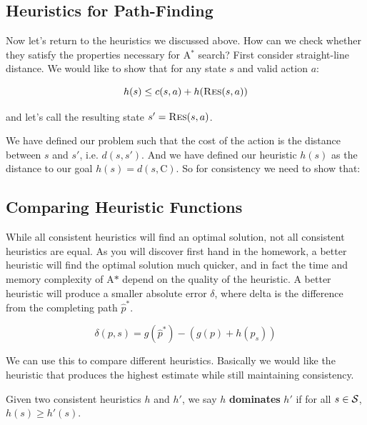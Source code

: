 \documentclass[10pt]{article}
\begin{document}
\subsection{Heuristics for Path-Finding}

Now let's return to the heuristics we discussed above. How can we check whether they satisfy the properties necessary for A$^*$ search? First consider straight-line distance. We would like to show that for any state $s$ and valid action $a$:

\[h(s) \leq c(s, a) + h(\mathrm{\textsc{Res}}(s, a))\]

\noindent and let's call the resulting state $s' = \mathrm{\textsc{Res}}(s, a)$.

We have defined our problem such that the cost of the action is the distance between $s$ and $s'$, i.e. $d(s, s')$. And we have defined our heuristic $h(s)$ as the distance to our goal $h(s) = d(s, \mathrm{C})$. So for consistency we need to show that: 




\subsection{Comparing Heuristic Functions}

While all consistent heuristics will find an optimal solution, not all
consistent heuristics are equal. As you will discover first hand in
the homework, a better heuristic will find the optimal solution much
quicker, and in fact the time and memory complexity of A$*$ depend on 
the quality of the heuristic. A better heuristic will produce a smaller
absolute error $\delta$, where delta is the difference from the completing 
path $\hat{p}^*$.

\[\delta(p, s) = g(\hat{p}^*) - (g(p) + h(p_s)) \] 

We can use this to compare different heuristics. Basically we would like 
the heuristic that produces the highest estimate while still maintaining 
consistency.

\begin{defn}
  Given two consistent heuristics $h$ and $h'$, we say $h$ \textbf{dominates} $h'$ if 
  for all $s\in\mathcal{S}$, $h(s) \geq h'(s)$. 
\end{defn}
\end{document}
